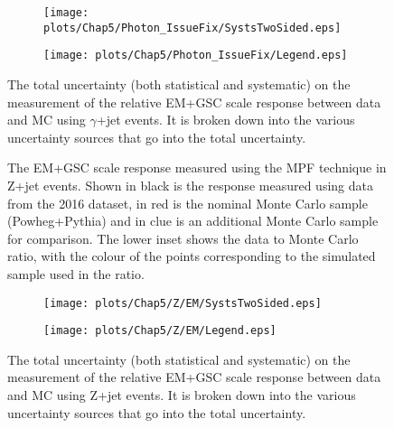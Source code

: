 \begin{figure}[!ht]
\captionsetup[subfigure]{labelformat=empty}
 \begin{center}
   \begin{subfigure}{0.55\textwidth}
     \hspace{-3cm}
     \texttt{[image: plots/Chap5/Photon\_IssueFix/SystsTwoSided.eps]}
   \end{subfigure}
   \begin{subfigure}{0.55\textwidth}     \hspace{-3cm}
     \texttt{[image: plots/Chap5/Photon\_IssueFix/Legend.eps]}
   \end{subfigure}
 \end{center}
 \caption[Uncertainty on the EM+GSC scale response measurement using $\gamma$+jet]
 {\small The total uncertainty (both statistical and systematic) on the measurement of the relative EM+GSC scale response between data and MC using $\gamma$+jet events.  It is broken down into the various uncertainty sources that go into the total uncertainty.  }
 \label{Fig:GJetSystsEM2016}
\end{figure}

\begin{figure}[!ht]
  \begin{center}
  \end{center}
  \caption[EM scale response using Z+jet in 2016]
  {\small The EM+GSC scale response measured using the MPF technique in Z+jet events.  Shown in black is the response measured using data from the 2016 dataset, in red is the nominal Monte Carlo sample (Powheg+Pythia) and in clue is an additional Monte Carlo sample for comparison.  The lower inset shows the data to Monte Carlo ratio, with the colour of the points corresponding to the simulated sample used in the ratio.  }
  \label{plot:ZJetEM2016App}
\end{figure}

\begin{figure}[!ht]
\captionsetup[subfigure]{labelformat=empty}
 \begin{center}
   \begin{subfigure}{0.55\textwidth}
     \hspace{-3cm}
     \texttt{[image: plots/Chap5/Z/EM/SystsTwoSided.eps]}
   \end{subfigure}
   \begin{subfigure}{0.55\textwidth}     \hspace{-3cm}
     \texttt{[image: plots/Chap5/Z/EM/Legend.eps]}
   \end{subfigure}
 \end{center}
 \caption[Uncertainty on the EM+GSC scale response measurement using Z+jet]
 {\small The total uncertainty (both statistical and systematic) on the measurement of the relative EM+GSC scale response between data and MC using Z+jet events.  It is broken down
into the various uncertainty sources that go into the total uncertainty.  }
 \label{Fig:ZJetSystsEM2016}
\end{figure}

